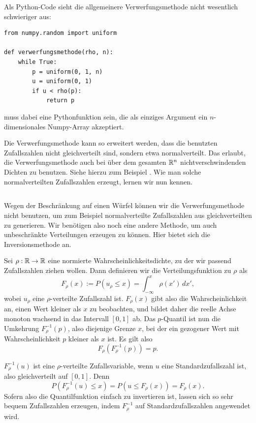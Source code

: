 Als Python-Code sieht die allgemeinere Verwerfungsmethode nicht
wesentlich schwieriger aus:
\begin{lstlisting}
from numpy.random import uniform

def verwerfungsmethode(rho, n):
    while True:
        p = uniform(0, 1, n)
        u = uniform(0, 1)
        if u < rho(p):
            return p
\end{lstlisting}
 muss dabei eine Pythonfunktion sein, die als einziges
Argument ein $n$-dimensionales Numpy-Array akzeptiert.

Die Verwerfungsmethode kann so erweitert werden, dass die benutzten
Zufallszahlen  nicht gleichverteilt sind, sondern etwa
normalverteilt. Das erlaubt, die Verwerfungsmethode auch bei über dem
gesamten $\mathbb{R}^n$ nichtverschwindenden Dichten zu benutzen. Siehe
hierzu zum Beispiel \textcite{knuth81b}. Wie man solche
normalverteilten Zufallszahlen erzeugt, lernen wir nun kennen.

\subsection{}

Wegen der Beschränkung auf einen Würfel können wir die
Verwerfungsmethode nicht benutzen, um zum Beispiel normalverteilte
Zufallszahlen aus gleichverteilten zu generieren. Wir benötigen also
noch eine andere Methode, um auch unbeschränkte Verteilungen erzeugen
zu können. Hier bietet sich die Inversionsmethode an.

Sei $\rho:\mathbb{R}\to \mathbb{R}$ eine normierte Wahrscheinlichkeitsdichte, zu der
wir passend Zufallszahlen ziehen wollen. Dann definieren wir die
Verteilungsfunktion zu $\rho$ als
\begin{equation}
  F_\rho(x) := P(u_\rho \le x) = \int_{-\infty}^{x} \rho(x')\, dx',
\end{equation}
wobei $u_\rho$ eine $\rho$-verteilte Zufallszahl ist.  $F_\rho(x)$
gibt also die Wahrscheinlichkeit an, einen Wert kleiner als $x$ zu
beobachten, und bildet daher die reelle Achse monoton wachsend in das
Intervall $[0,1]$ ab. Das $p$-Quantil ist nun die Umkehrung
$F_\rho^{-1}(p)$, also diejenige Grenze $x$, bei der ein gezogener
Wert mit Wahrscheinlichkeit $p$ kleiner als $x$ ist. Es gilt also
\begin{equation}
  F_\rho\left(F_\rho^{-1}(p)\right) = p.
\end{equation}

$F_\rho^{-1}(u)$ ist eine $\rho$-verteilte Zufallsvariable, wenn $u$
eine Standardzufallszahl ist, also gleichverteilt auf $[0,1]$. Denn
\begin{equation}
  P(F_\rho^{-1}(u) \le x) = P(u \le F_\rho(x)) = F_\rho(x).
\end{equation}
Sofern also die Quantilfunktion einfach zu invertieren ist, lassen
sich so sehr bequem Zufallszahlen erzeugen, indem $F_\rho^{-1}$ auf
Standardzufallszahlen angewendet wird.

